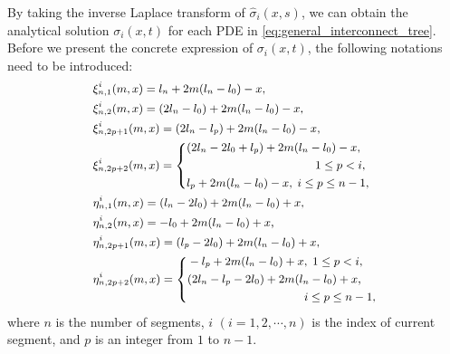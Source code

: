 By taking the inverse Laplace transform of $\hat{\sigma}_{i}(x,s)$, we can obtain the analytical solution $\sigma_i(x,t)$
for each PDE in \eqref{eq:general_interconnect_tree}. Before we present the concrete expression of $\sigma_i(x,t)$, the following notations
need to be introduced: 
\begin{equation} \label{generalNotations}\small
\begin{split}
&\xi_{n,1}^{i}(m,x)=l_n+2m(l_n-l_0)-x,\\
&\xi_{n,2}^{i}(m,x)=(2l_n-l_0)+2m(l_n-l_0)-x,\\
&\xi_{n,2p+1}^{i}(m,x)=(2l_n-l_p)+2m(l_n-l_0)-x,\\
&\xi_{n,2p+2}^{i}(m,x)=\left\{
   \begin{aligned}
   &(2l_n-2l_0+l_p)+2m(l_n-l_0)-x,\;\\
   &\qquad\qquad\qquad\qquad\qquad\quad 1\leq p<i,  \\
   &l_p+2m(l_n-l_0)-x,\;i\leq p\leq n-1, \\
      \end{aligned}
   \right. \\
&\eta_{n,1}^{i}(m,x)=(l_n-2l_0)+2m(l_n-l_0)+x,\\
&\eta_{n,2}^{i}(m,x)=-l_0+2m(l_n-l_0)+x,\\
&\eta_{n,2p+1}^{i}(m,x)=(l_p-2l_0)+2m(l_n-l_0)+x,\\
&\eta_{n,2p+2}^{i}(m,x)=\left\{
   \begin{aligned}
   &-l_p+2m(l_n-l_0)+x,\;1\leq p<i,  \\
   &(2l_n-l_p-2l_0)+2m(l_n-l_0)+x,\; \\
   &\qquad\qquad\qquad\qquad\qquad i\leq p \leq n-1, \\
   \end{aligned}
   \right.
\end{split}
\end{equation}
where $n$ is the number of segments, $i$ $(i=1,2,\cdots,n)$ is the index of current segment, and $p$ is an integer from $1$ to $n-1$.

